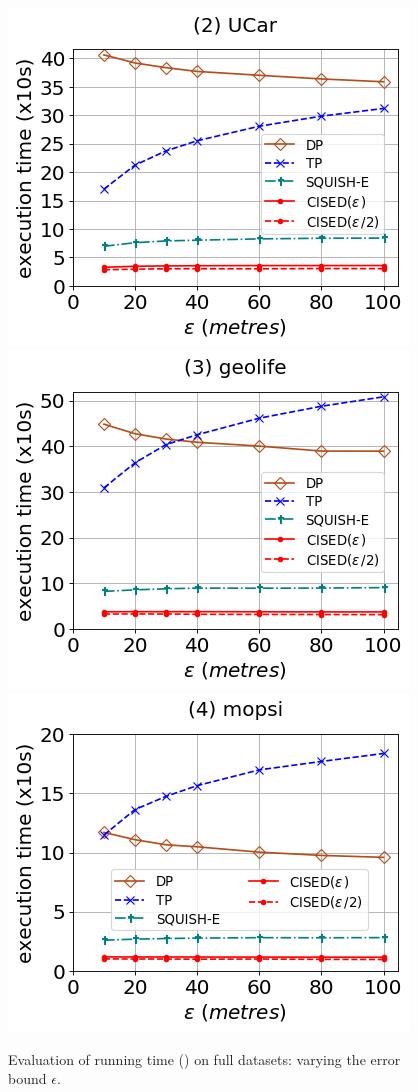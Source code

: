\begin{figure}[tb!]
	\centering
	\includegraphics[scale=0.320]{Figures/Exp-SED-time-epsilon-service.png}	\hspace{3ex}
	\includegraphics[scale=0.320]{Figures/Exp-SED-time-epsilon-geolife.png}	\hspace{3ex}
	\includegraphics[scale=0.320]{Figures/Exp-SED-time-epsilon-mopsi.png}	
	\vspace{-2ex}
	\caption{\small Evaluation of running time (\sed) on full datasets: varying the error bound $\epsilon$.}\label{fig:time-epsilon-sed}
	\vspace{-2ex}
\end{figure}

